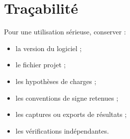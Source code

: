 \section{Traçabilité}

Pour une utilisation sérieuse, conserver :

\begin{itemize}
  \item la version du logiciel ;
  \item le fichier projet ;
  \item les hypothèses de charges ;
  \item les conventions de signe retenues ;
  \item les captures ou exports de résultats ;
  \item les vérifications indépendantes.
\end{itemize}
